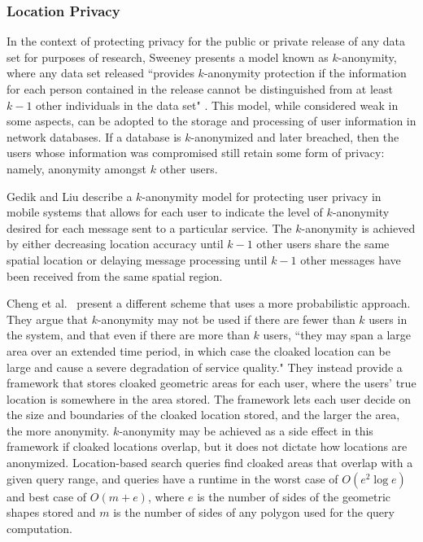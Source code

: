 \subsubsection{Location Privacy}

In the context of protecting privacy for the public or private release of any data set for purposes of research, Sweeney \cite{sweeney} presents a model known as $k$-anonymity, where any data set released ``provides $k$-anonymity protection if the information for each person contained in the release cannot be distinguished from at least $k -1$ other individuals in the data set" \cite{sweeney}. This model, while considered weak in some aspects, can be adopted to the storage and processing of user information in network databases. If a database is $k$-anonymized and later breached, then the users whose information was compromised still retain some form of privacy: namely, anonymity amongst $k$ other users.

Gedik and Liu \cite{gedik} describe a $k$-anonymity model for protecting user privacy in mobile systems that allows for each user to indicate the level of $k$-anonymity desired for each message sent to a particular service. The $k$-anonymity is achieved by either decreasing location accuracy until $k-1$ other users share the same spatial location or delaying message processing until $k-1$ other messages have been received from the same spatial region.

Cheng et al.~\cite{Cheng2006} present a different scheme that uses a more probabilistic approach. They argue that $k$-anonymity may not be used if there are fewer than $k$ users in the system, and that even if there are more than $k$ users, ``they may span a large area over an extended time period, in which case the cloaked location can be large and cause a severe degradation of service quality." They instead provide a framework that stores cloaked geometric areas for each user, where the users' true location is somewhere in the area stored. The framework lets each user decide on the size and boundaries of the cloaked location stored, and the larger the area, the more anonymity. $k$-anonymity may be achieved as a side effect in this framework if cloaked locations overlap, but it does not dictate how locations are anonymized. Location-based search queries find cloaked areas that overlap with a given query range, and queries have a runtime in the worst case of $O(e^2\log e)$ and best case of $O(m+e)$, where $e$ is the number of sides of the geometric shapes stored and $m$ is the number of sides of any polygon used for the query computation.

